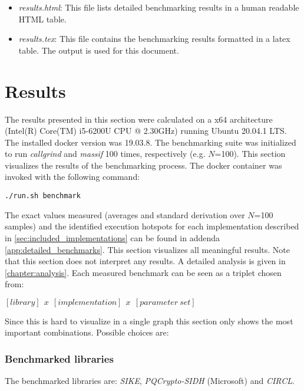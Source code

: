 \begin{itemize}
\begin{itemize}
	\item \textit{results.html}: This file lists detailed benchmarking results in a human readable HTML table. 
	
	\item \textit{results.tex}: This file contains the benchmarking results formatted in a latex table. The output is used for this document.
	\end{itemize}

\end{itemize}

\section{Results}\label{sec:benchmarks_results}
The results presented in this section were calculated on a x64 architecture (Intel(R) Core(TM) i5-6200U CPU @ 2.30GHz) running Ubuntu 20.04.1 LTS. The installed docker version was 19.03.8. 
The benchmarking suite was initialized to run \textit{callgrind} and \textit{massif} 100 times, respectively (e.g. $N$=100). This section visualizes the results of the benchmarking process. The docker container was invoked with the following command:
\begin{lstlisting}[numbers=none,linewidth=4cm]
./run.sh benchmark
\end{lstlisting}
The exact values measured (averages and standard derivation over $N$=100 samples) and the identified execution hotspots for each implementation described in \autoref{sec:included_implementations} can be found in addenda \ref{app:detailed_benchmarks}. This section visualizes all meaningful results. Note that this section does not interpret any results. A detailed analysis is given in \autoref{chapter:analysis}.
Each measured benchmark can be seen as a triplet chosen from:

\begin{center}
$[library]\:\:x\:\:[implementation]\:\:x\:\:[parameter\:set]$
\end{center}
Since this is hard to visualize in a single graph this section only shows the most important combinations. Possible choices are:

\subsubsection{Benchmarked libraries}
The benchmarked libraries are: \textit{SIKE}, \textit{PQCrypto-SIDH} (Microsoft) and \textit{CIRCL}.

